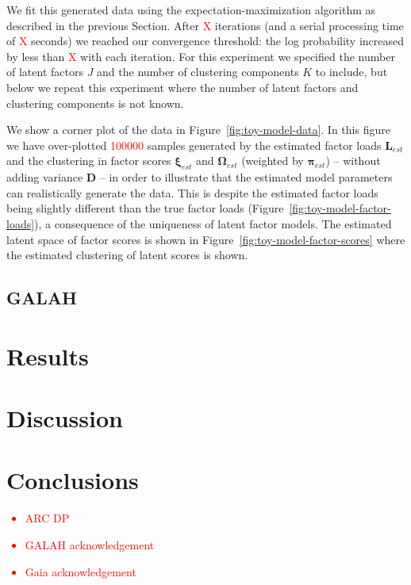 \documentclass[twocolumn]{aastex61}
\newcommand{\todo}[1]{\textcolor{red}{#1}}
\newcommand{\vect}[1]{\boldsymbol{\mathbf{#1}}}
\renewcommand{\vec}[1]{\vect{#1}}
\newcommand{\weight}{\pi}
\newcommand{\factorloads}{\textbf{L}}
\newcommand{\specificvariance}{\vec{D}}
\newcommand{\scoremeans}{\vec\xi}
\newcommand{\scorecovs}{\vec\Omega}
\begin{document}
We fit this generated data using the expectation-maximization algorithm
as described in the previous Section. After \todo{X} iterations
(and a serial processing time of \todo{X} seconds) we
reached our convergence threshold: the log probability increased by
less than \todo{X} with each iteration. For this experiment we specified
the number of latent factors $J$ and the number of clustering components
$K$ to include, but below we repeat this experiment where the number
of latent factors and clustering components is not known.

We show a corner plot of the data in Figure~\ref{fig:toy-model-data}.
In this figure we have over-plotted \todo{100000} samples generated by the
estimated factor loads $\factorloads_{est}$ and the clustering in factor 
scores $\scoremeans_{est}$ and $\scorecovs_{est}$ (weighted by $\vec\weight_{est}$)
-- without adding variance $\specificvariance$ -- in order to illustrate that the
estimated model parameters can realistically generate the data.
This is despite the estimated factor loads being slightly different
than the true factor loads (Figure~\ref{fig:toy-model-factor-loads}),
a consequence of the uniqueness of latent factor models. The estimated
latent space of factor scores is shown in Figure~\ref{fig:toy-model-factor-scores}
where the estimated clustering of latent scores is shown.






\subsection{GALAH} \label{sec:experiment-galah}



\section{Results} \label{sec:results}

\section{Discussion} \label{sec:discussion}

\section{Conclusions} \label{sec:conclusion}

\acknowledgements 
\todo{
\begin{itemize}
	\item ARC DP
	\item GALAH acknowledgement
	\item Gaia acknowledgement
\end{itemize}
}
\end{document}
